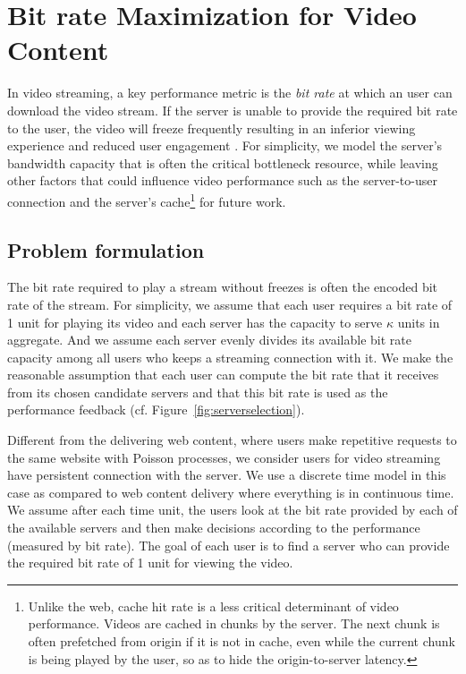 \documentclass[conference]{IEEEtran}
\begin{document}
\section{Bit rate Maximization for Video Content}
\label{sec:maxbitrate}
In video streaming, a key performance metric is the {\em bit rate} at which an user can download the video stream. If the server is unable to provide the required bit rate  to the user, the video will freeze frequently resulting in an inferior viewing experience and reduced user engagement \cite{KrishnanS12}.  For simplicity, we model the server's bandwidth capacity that is often the critical bottleneck  resource, while leaving other factors that could  influence video performance such as the server-to-user connection and the server's cache\footnote{Unlike the web, cache hit rate is a less critical determinant of  video performance. Videos are cached in chunks by the server. The next chunk is often prefetched from origin if it is not  in cache, even while the current chunk is being played by the user,  so as to hide the origin-to-server latency.} for future work. 

\subsection{Problem formulation}
The bit rate required to play a stream without freezes is often the encoded  bit rate of the stream. For simplicity, we assume that each user requires a bit rate of 1 unit for playing its video and each server has the capacity to serve $\kappa$ units in aggregate. And we assume each server evenly divides its available bit rate capacity among all users who keeps a streaming connection with it. We make the reasonable assumption that each user can compute the bit rate that it receives from its chosen candidate servers and that this bit rate is used as the performance feedback (cf. Figure~\ref{fig:serverselection}).

Different from the delivering web content, where users make repetitive requests to the same website with Poisson processes, we consider users for video streaming have persistent connection with the server. We use a discrete time model in this case as compared to web content delivery where everything is in continuous time. We assume after each time unit, the users look at the bit rate provided by each of the available servers and then make decisions according to the performance (measured by bit rate).
The goal of each user is to find a server who can provide the required bit rate of 1 unit for viewing the video.
\end{document}
